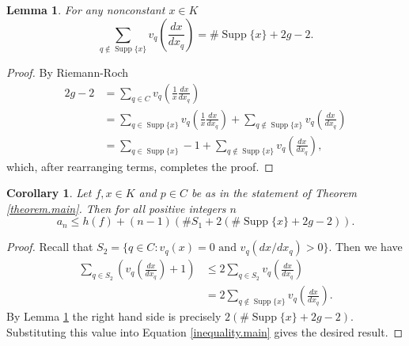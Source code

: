 \documentclass{amsart}
\newtheorem{lemma}[theorem]{Lemma}
\newtheorem{cor}[theorem]{Corollary}
\theoremstyle{definition}
\theoremstyle{remark}
\numberwithin{equation}{section}
\begin{document}
\begin{lemma}\label{lemma.rr}
For any nonconstant $x\in K$
\[
\sum_{q\notin\operatorname{Supp}\{x\}} v_q\left(\frac{dx}{dx_q}\right) = \#\operatorname{Supp}\{x\}+2g-2.
\]
\end{lemma}

\begin{proof}
By Riemann-Roch
\begin{align*}
2g-2 &= \sum_{q\in C} v_q\left(\frac{1}{x}\frac{dx}{dx_q}\right)\\
&= \sum_{q\in \operatorname{Supp}\{x\}}v_q\left(\frac{1}{x}\frac{dx}{dx_q}\right)+\sum_{q\notin\operatorname{Supp}\{x\}}v_q\left(\frac{dx}{dx_q}\right)\\
&= \sum_{q\in \operatorname{Supp}\{x\}}-1+\sum_{q\notin\operatorname{Supp}\{x\}}v_q\left(\frac{dx}{dx_q}\right),
\end{align*}
which, after rearranging terms, completes the proof.
\end{proof}

\begin{cor}\label{cor.simple}
Let $f, x\in K$ and $p\in C$ be as in the statement of Theorem \ref{theorem.main}. Then for all positive integers $n$
\[
a_n \leq h(f)+(n-1)\left(\#S_1+2(\#\operatorname{Supp}\{x\} +2g-2)\right).
\]
\end{cor}

\begin{proof}
Recall that $S_2 = \{q \in C : v_q(x) = 0 \text{ and } v_q(dx/dx_q) > 0\}$. Then we have
\begin{align*}
\sum_{q\in S_2} \left(v_q\left(\frac{dx}{dx_q}\right)+1\right) &\leq 2\sum_{q\in S_2}v_q\left(\frac{dx}{dx_q}\right)\\
&=2\sum_{q\notin \operatorname{Supp}\{x\}} v_q \left(\frac{dx}{dx_q}\right).
\end{align*}
By Lemma \ref{lemma.rr} the right hand side is precisely $2(\#\operatorname{Supp}\{x\}+2g-2)$. Substituting this value into Equation \ref{inequality.main} gives the desired result.
\end{proof}



\end{document}
